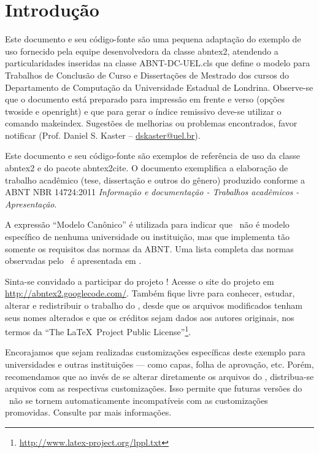 \documentclass[
	12pt,				%
	openright,			%
	oneside,			%
	a4paper,			%
	dissertacao,			%
	]{ABNT-DC-UEL}
\begin{document}
\chapter{Introdução}

Este documento e seu código-fonte são uma pequena adaptação do exemplo de uso
fornecido pela equipe desenvolvedora da classe \textsf{abntex2}, atendendo a
particularidades inseridas na classe \textsf{ABNT-DC-UEL.cls} que define
o modelo para Trabalhos de Conclusão de Curso e Dissertações de Mestrado dos
cursos do Departamento de Computação da Universidade Estadual de Londrina.
Observe-se que o documento está preparado para impressão em frente e verso
(opções twoside e openright) e que para gerar o índice remissivo deve-se 
utilizar o comando \textsf{makeindex}.
Sugestões de melhorias ou problemas encontrados, favor notificar (Prof.
Daniel S. Kaster -- \href{mailto:dskaster@uel.br}{dskaster@uel.br}).

Este documento e seu código-fonte são exemplos de referência de uso da classe
\textsf{abntex2} e do pacote \textsf{abntex2cite}. O documento 
exemplifica a elaboração de trabalho acadêmico (tese, dissertação e outros do
gênero) produzido conforme a ABNT NBR 14724:2011 \emph{Informação e documentação
- Trabalhos acadêmicos - Apresentação}.

A expressão ``Modelo Canônico'' é utilizada para indicar que \abnTeX\ não é
modelo específico de nenhuma universidade ou instituição, mas que implementa tão
somente os requisitos das normas da ABNT. Uma lista completa das normas
observadas pelo \abnTeX\ é apresentada em .

Sinta-se convidado a participar do projeto \abnTeX! Acesse o site do projeto em
\url{http://abntex2.googlecode.com/}. Também fique livre para conhecer,
estudar, alterar e redistribuir o trabalho do \abnTeX, desde que os arquivos
modificados tenham seus nomes alterados e que os créditos sejam dados aos
autores originais, nos termos da ``The \LaTeX\ Project Public
License''\footnote{\url{http://www.latex-project.org/lppl.txt}}.

Encorajamos que sejam realizadas customizações específicas deste exemplo para
universidades e outras instituições --- como capas, folha de aprovação, etc.
Porém, recomendamos que ao invés de se alterar diretamente os arquivos do
\abnTeX, distribua-se arquivos com as respectivas customizações.
Isso permite que futuras versões do \abnTeX~não se tornem automaticamente
incompatíveis com as customizações promovidas. Consulte
 par mais informações.
\end{document}
